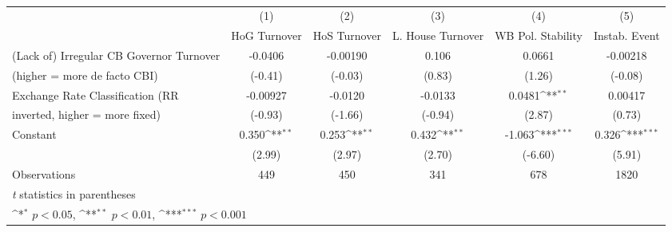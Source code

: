 \begin{table}[htbp]\centering
\def\sym#1{\ifmmode^{#1}\else\(^{#1}\)\fi}
\caption{\label{nondemocraciesFEDF}}
\begin{tabular}{l*{5}{c}}
\toprule
                                        &\multicolumn{1}{c}{(1)}&\multicolumn{1}{c}{(2)}&\multicolumn{1}{c}{(3)}&\multicolumn{1}{c}{(4)}&\multicolumn{1}{c}{(5)}\\
                                        &\multicolumn{1}{c}{HoG Turnover}&\multicolumn{1}{c}{HoS Turnover}&\multicolumn{1}{c}{L. House Turnover}&\multicolumn{1}{c}{WB Pol. Stability}&\multicolumn{1}{c}{Instab. Event}\\
\midrule
(Lack of) Irregular CB Governor Turnover&  -0.0406         & -0.00190         &    0.106         &   0.0661         & -0.00218         \\
(higher = more de facto CBI)            &  (-0.41)         &  (-0.03)         &   (0.83)         &   (1.26)         &  (-0.08)         \\
\addlinespace
Exchange Rate Classification (RR        & -0.00927         &  -0.0120         &  -0.0133         &   0.0481\sym{**} &  0.00417         \\
inverted, higher = more fixed)          &  (-0.93)         &  (-1.66)         &  (-0.94)         &   (2.87)         &   (0.73)         \\
\addlinespace
Constant                                &    0.350\sym{**} &    0.253\sym{**} &    0.432\sym{**} &   -1.063\sym{***}&    0.326\sym{***}\\
                                        &   (2.99)         &   (2.97)         &   (2.70)         &  (-6.60)         &   (5.91)         \\
\midrule
Observations                            &      449         &      450         &      341         &      678         &     1820         \\
\bottomrule
\multicolumn{6}{l}{\footnotesize \textit{t} statistics in parentheses}\\
\multicolumn{6}{l}{\footnotesize \sym{*} \(p<0.05\), \sym{**} \(p<0.01\), \sym{***} \(p<0.001\)}\\
\end{tabular}
\end{table}
